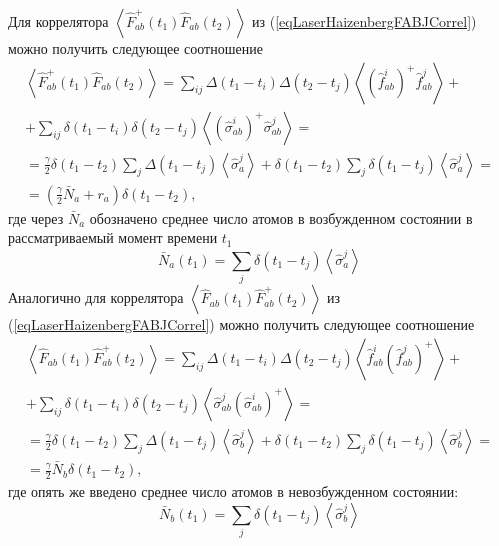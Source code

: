 Для коррелятора 
$\left<\hat{F}_{ab}^{+}\left(t_1\right)\hat{F}_{ab}\left(t_2\right)\right>$
из (\ref{eqLaserHaizenbergFABJCorrel}) можно получить следующее
соотношение
\begin{eqnarray}
\left<\hat{F}_{ab}^{+}\left(t_1\right)\hat{F}_{ab}\left(t_2\right)\right>
= \sum_{ij}\Delta\left(t_1 - t_i\right)\Delta\left(t_2 -
t_j\right)\left<\left(\hat{f}^{i}_{ab}\right)^{+}\hat{f}^{j}_{ab}\right>
+
\nonumber \\
+ 
\sum_{ij} \delta\left(t_1 - t_i\right)\delta\left(t_2 - t_j\right)
\left<\left(\hat{\sigma}^{i}_{ab}\right)^{+}\hat{\sigma}^{j}_{ab}\right>
= 
\nonumber \\
=
\frac{\gamma}{2}\delta\left(t_1 - t_2\right)\sum_{j}\Delta\left(t_1 -
t_j\right)\left<\hat{\sigma}^{j}_{a}\right> +
\delta\left(t_1 - t_2\right) \sum_{j} \delta\left(t_1 - t_j\right)
\left<\hat{\sigma}^{j}_{a}\right> 
=
\nonumber \\
= 
\left(
\frac{\gamma}{2}\bar{N}_a + r_a
\right)\delta\left(t_1 - t_2\right),
\label{eqLaserHaizenbergFABCorrel_1}
\end{eqnarray}
где через $\bar{N}_a$ обозначено среднее число атомов в возбужденном
состоянии в рассматриваемый момент времени $t_1$
\begin{equation}
\bar{N}_a\left(t_1\right) = \sum_{j} \delta\left(t_1 - t_j\right)
\left<\hat{\sigma}^{j}_{a}\right>
\nonumber 
\end{equation}
Аналогично для коррелятора 
$\left<\hat{F}_{ab}\left(t_1\right)\hat{F}_{ab}^{+}\left(t_2\right)\right>$
из (\ref{eqLaserHaizenbergFABJCorrel}) можно получить следующее
соотношение
\begin{eqnarray}
\left<\hat{F}_{ab}\left(t_1\right)\hat{F}_{ab}^{+}\left(t_2\right)\right>
= \sum_{ij}\Delta\left(t_1 - t_i\right)\Delta\left(t_2 -
t_j\right)\left<\hat{f}^{i}_{ab}\left(\hat{f}^{j}_{ab}\right)^{+}\right>
+
\nonumber \\
+ 
\sum_{ij} \delta\left(t_1 - t_i\right)\delta\left(t_2 - t_j\right)
\left<\hat{\sigma}^{j}_{ab}\left(\hat{\sigma}^{i}_{ab}\right)^{+}\right>
= 
\nonumber \\
=
\frac{\gamma}{2}\delta\left(t_1 - t_2\right)\sum_{j}\Delta\left(t_1 -
t_j\right)\left<\hat{\sigma}^{j}_{b}\right> +
\delta\left(t_1 - t_2\right) \sum_{j} \delta\left(t_1 - t_j\right)
\left<\hat{\sigma}^{j}_{b}\right> 
=
\nonumber \\
= 
\frac{\gamma}{2}\bar{N}_b\delta\left(t_1 - t_2\right),
\label{eqLaserHaizenbergFABCorrel_2}
\end{eqnarray}
где опять же введено среднее число атомов в невозбужденном состоянии:
\begin{equation}
\bar{N}_b\left(t_1\right) = \sum_{j} \delta\left(t_1 - t_j\right)
\left<\hat{\sigma}^{j}_{b}\right>
\nonumber 
\end{equation}

